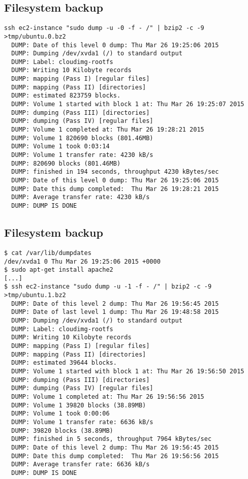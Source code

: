 \documentclass[xga]{xdvislides}
\begin{document}
\subsection{Filesystem backup}
\begin{verbatim}
ssh ec2-instance "sudo dump -u -0 -f - /" | bzip2 -c -9 >tmp/ubuntu.0.bz2
  DUMP: Date of this level 0 dump: Thu Mar 26 19:25:06 2015
  DUMP: Dumping /dev/xvda1 (/) to standard output
  DUMP: Label: cloudimg-rootfs
  DUMP: Writing 10 Kilobyte records
  DUMP: mapping (Pass I) [regular files]
  DUMP: mapping (Pass II) [directories]
  DUMP: estimated 823759 blocks.
  DUMP: Volume 1 started with block 1 at: Thu Mar 26 19:25:07 2015
  DUMP: dumping (Pass III) [directories]
  DUMP: dumping (Pass IV) [regular files]
  DUMP: Volume 1 completed at: Thu Mar 26 19:28:21 2015
  DUMP: Volume 1 820690 blocks (801.46MB)
  DUMP: Volume 1 took 0:03:14
  DUMP: Volume 1 transfer rate: 4230 kB/s
  DUMP: 820690 blocks (801.46MB)
  DUMP: finished in 194 seconds, throughput 4230 kBytes/sec
  DUMP: Date of this level 0 dump: Thu Mar 26 19:25:06 2015
  DUMP: Date this dump completed:  Thu Mar 26 19:28:21 2015
  DUMP: Average transfer rate: 4230 kB/s
  DUMP: DUMP IS DONE
\end{verbatim}


\subsection{Filesystem backup}
\begin{verbatim}
$ cat /var/lib/dumpdates 
/dev/xvda1 0 Thu Mar 26 19:25:06 2015 +0000
$ sudo apt-get install apache2
[...]
$ ssh ec2-instance "sudo dump -u -1 -f - /" | bzip2 -c -9 >tmp/ubuntu.1.bz2
  DUMP: Date of this level 2 dump: Thu Mar 26 19:56:45 2015
  DUMP: Date of last level 1 dump: Thu Mar 26 19:48:58 2015
  DUMP: Dumping /dev/xvda1 (/) to standard output
  DUMP: Label: cloudimg-rootfs
  DUMP: Writing 10 Kilobyte records
  DUMP: mapping (Pass I) [regular files]
  DUMP: mapping (Pass II) [directories]
  DUMP: estimated 39644 blocks.
  DUMP: Volume 1 started with block 1 at: Thu Mar 26 19:56:50 2015
  DUMP: dumping (Pass III) [directories]
  DUMP: dumping (Pass IV) [regular files]
  DUMP: Volume 1 completed at: Thu Mar 26 19:56:56 2015
  DUMP: Volume 1 39820 blocks (38.89MB)
  DUMP: Volume 1 took 0:00:06
  DUMP: Volume 1 transfer rate: 6636 kB/s
  DUMP: 39820 blocks (38.89MB)
  DUMP: finished in 5 seconds, throughput 7964 kBytes/sec
  DUMP: Date of this level 2 dump: Thu Mar 26 19:56:45 2015
  DUMP: Date this dump completed:  Thu Mar 26 19:56:56 2015
  DUMP: Average transfer rate: 6636 kB/s
  DUMP: DUMP IS DONE
\end{verbatim}
\end{document}
